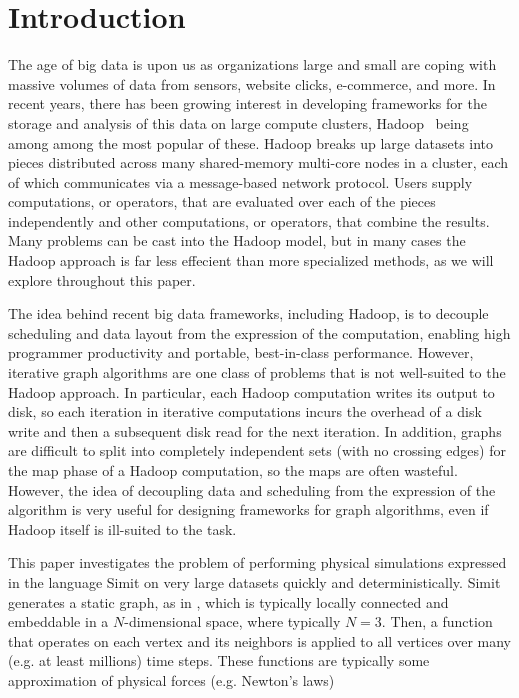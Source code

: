 \section{Introduction}
\label{sec:intro}

The age of {\large big data} is upon us as organizations large and small 
are coping with massive volumes of data from sensors, website 
clicks, e-commerce, and more. In recent years, there has been 
growing interest in developing frameworks for the storage and 
analysis of this data on large compute clusters, 
Hadoop~\cite{CuttingCa05,DeanGh08} being among among the most 
popular of these. Hadoop breaks up 
large datasets into pieces distributed across many shared-memory
multi-core nodes in a cluster, each of which communicates via
a message-based network protocol. Users supply computations, 
or  operators, that are evaluated over each of 
the pieces independently and other computations, or  
operators, that combine the results. 
Many problems can be cast into the Hadoop model, but in many 
cases the Hadoop approach is far less effecient than more 
specialized methods, as we will explore throughout this paper.

The idea behind recent big data frameworks, including Hadoop, 
is to decouple scheduling and
data layout from the expression of the computation, enabling high
programmer productivity and portable, best-in-class performance.
However, iterative graph algorithms are one class of problems that
is not well-suited to the Hadoop approach. In particular, each 
Hadoop computation writes its output to disk, so each iteration 
in iterative computations incurs the overhead of a disk write 
and then a subsequent disk read for the next iteration. In 
addition, graphs are difficult to split into completely 
independent sets (with no crossing edges) for the map phase 
of a Hadoop computation, so the maps are often wasteful.
However, the idea of decoupling data and scheduling from the expression of
the algorithm is very useful for designing frameworks
for graph algorithms, even if Hadoop itself is ill-suited to 
the task.  



This paper investigates the problem of performing physical simulations
expressed in the language Simit on very large datasets quickly and
deterministically.  Simit generates a static graph, as in , 
which is typically
locally connected and embeddable in a $N$-dimensional space, where typically
$N=3$.  Then, a function that operates on each vertex and its neighbors 
is applied to all vertices over many (e.g. at least millions) time steps.
These functions are typically some approximation of physical forces (e.g.
Newton's laws)  

